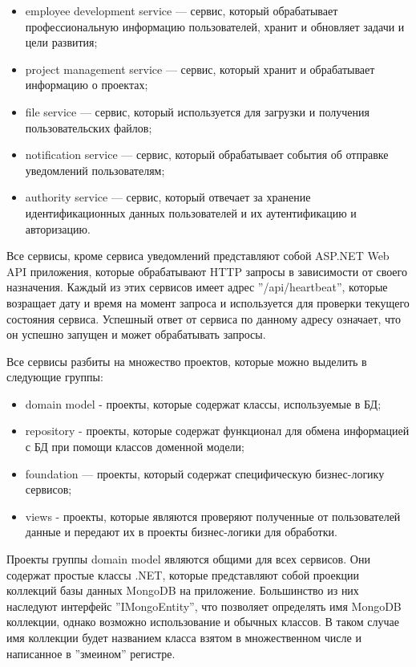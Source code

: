 \begin{itemize}
    \item employee development service — сервис, который обрабатывает профессиональную информацию пользователей, хранит и обновляет задачи и цели развития;
    \item project management service — сервис, который хранит и обрабатывает информацию о проектах;
    \item file service — сервис, который используется для загрузки и получения пользовательских файлов;
    \item notification service — сервис, который обрабатывает события об отправке уведомлений пользователям;
    \item authority service — сервис, который отвечает за хранение идентификационных данных пользователей и их аутентификацию и авторизацию.
\end{itemize}

Все сервисы, кроме сервиса уведомлений представляют собой ASP.NET Web API приложения, которые обрабатывают HTTP запросы в зависимости от своего назначения. Каждый из этих сервисов имеет адрес ''/api/heartbeat'', которые возращает дату и время на момент запроса и используется для проверки текущего состояния сервиса. Успешный ответ от сервиса по данному адресу означает, что он успешно запущен и может обрабатывать запросы.

Все сервисы разбиты на множество проектов, которые можно выделить в следующие группы:

\begin{itemize}
    \item domain model - проекты, которые содержат классы, используемые в БД;
    \item repository - проекты, которые содержат функционал для обмена информацией с БД при помощи классов доменной модели;
    \item foundation — проекты, который содержат специфическую бизнес-логику сервисов;
    \item views - проекты, которые являются проверяют полученные от пользователей данные и передают их в проекты бизнес-логики для обработки.
\end{itemize}

Проекты группы domain model являются общими для всех сервисов. Они содержат простые классы .NET, которые представляют собой проекции коллекций базы данных MongoDB на приложение. Большинство из них наследуют интерфейс ''IMongoEntity'', что позволяет определять имя MongoDB коллекции, однако возможно использование и обычных классов. В таком случае имя коллекции будет названием класса взятом в множественном числе и написанное в ''змеином'' регистре.

